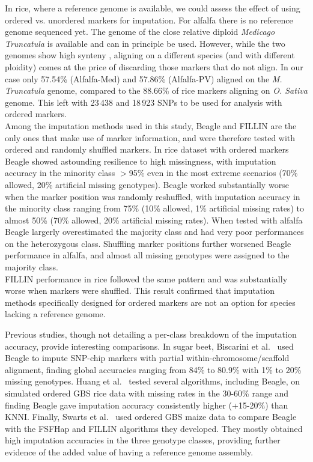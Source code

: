 In rice, where a reference genome is available, we could assess the effect of using ordered vs. unordered markers for imputation. For alfalfa there is no reference genome sequenced yet. The genome of the close relative diploid \emph{Medicago Truncatula} is available \cite{young_medicago_2011} and can in principle be used. However, while the two genomes show high synteny \cite{li_saturated_2014}, aligning on a different species (and with different ploidity) comes at the price of discarding those markers that do not align. In our case only 57.54\% (Alfalfa-Med) and 57.86\% (Alfalfa-PV) aligned on the \emph{M. Truncatula} genome, compared to the 88.66\% of rice markers aligning on \emph{O. Sativa} genome. This left with 23\,438 and 18\,923 SNPs to be used for analysis with ordered markers. \\
Among the imputation methods used in this study, Beagle and FILLIN are the only ones that make use of marker information, and were therefore tested with ordered and randomly shuffled markers. In rice dataset with ordered markers Beagle showed astounding resilience to high missingness, with imputation accuracy in the minority class $>$95\% even in the most extreme scenarios (70\% allowed, 20\% artificial missing genotypes).
Beagle worked substantially worse when the marker position was randomly reshuffled, with imputation accuracy in the minority class ranging from 75\% (10\% allowed, 1\% artificial missing rates) to almost 50\% (70\% allowed, 20\% artificial missing rates). When tested with alfalfa Beagle largerly overestimated the majority class and had very poor performances on the heterozygous class. Shuffling marker positions further worsened Beagle performance in alfalfa, and almost all missing genotypes were assigned to the majority class.\\
FILLIN performance in rice followed the same pattern and was substantially worse when markers were shuffled. This result confirmed that imputation methods specifically designed for ordered markers are not an option for species lacking a reference genome.

Previous studies, though not detailing a per-class breakdown of the imputation accuracy, provide interesting comparisons. In sugar beet, Biscarini et al.~\cite{biscarini_genome-enabled_2014} used Beagle to impute SNP-chip markers with partial within-chromosome/scaffold alignment, finding global accuracies ranging from 84\% to 80.9\% with 1\% to 20\% missing genotypes. Huang et al.~\cite{huang_efficient_2014} tested several algorithms, including Beagle, on simulated ordered GBS rice data with missing rates in the 30-60\% range and finding Beagle gave imputation accuracy consistently higher (+15-20\%) than KNNI. 
Finally, Swarts et al.~\cite{swarts_novel_2014} used ordered GBS maize data to compare Beagle with the FSFHap and FILLIN algorithms they developed. They mostly obtained high imputation accuracies in the three genotype classes, providing further evidence of the added value of having a reference genome assembly.


